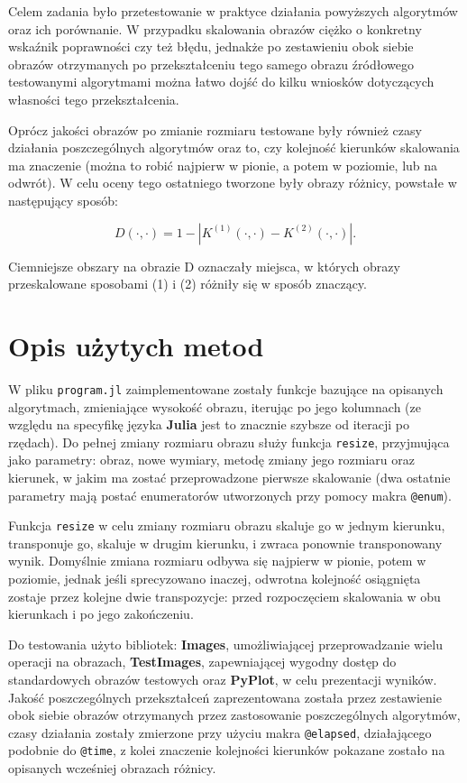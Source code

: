 \documentclass{article}
\begin{document}
Celem zadania było przetestowanie w praktyce działania powyższych algorytmów oraz ich porównanie. W przypadku skalowania obrazów ciężko o konkretny wskaźnik poprawności czy też błędu, jednakże po zestawieniu obok siebie obrazów otrzymanych po przekształceniu tego samego obrazu źródłowego testowanymi algorytmami można łatwo dojść do kilku wniosków dotyczących własności tego przekształcenia.

Oprócz jakości obrazów po zmianie rozmiaru testowane były również czasy działania poszczególnych algorytmów oraz to, czy kolejność kierunków skalowania ma znaczenie (można to robić najpierw w pionie, a potem w poziomie, lub na odwrót). W celu oceny tego ostatniego tworzone były obrazy różnicy, powstałe w następujący sposób:

$$D(\cdot,\cdot) = 1 - |K^{(1)}(\cdot,\cdot) - K^{(2)}(\cdot,\cdot)|.$$

Ciemniejsze obszary na obrazie D oznaczały miejsca, w których obrazy przeskalowane sposobami (1) i (2) różniły się w sposób znaczący.

\section{Opis użytych metod}

W pliku \texttt{program.jl} zaimplementowane zostały funkcje bazujące na opisanych algorytmach, zmieniające wysokość obrazu, iterując po jego kolumnach (ze względu na specyfikę języka \textbf{Julia} jest to znacznie szybsze od iteracji po rzędach). Do pełnej zmiany rozmiaru obrazu służy funkcja \texttt{resize}, przyjmująca jako parametry: obraz, nowe wymiary, metodę zmiany jego rozmiaru oraz kierunek, w jakim ma zostać przeprowadzone pierwsze skalowanie (dwa ostatnie parametry mają postać enumeratorów utworzonych przy pomocy makra \texttt{@enum}).  

Funkcja \texttt{resize} w celu zmiany rozmiaru obrazu skaluje go w jednym kierunku, transponuje go, skaluje w drugim kierunku, i zwraca ponownie transponowany wynik. Domyślnie zmiana rozmiaru odbywa się najpierw w pionie, potem w poziomie, jednak jeśli sprecyzowano inaczej, odwrotna kolejność osiągnięta zostaje przez kolejne dwie transpozycje: przed rozpoczęciem skalowania w obu kierunkach i po jego zakończeniu.

Do testowania użyto bibliotek: \textbf{Images}, umożliwiającej przeprowadzanie wielu operacji na obrazach, \textbf{TestImages}, zapewniającej wygodny dostęp do standardowych obrazów testowych oraz \textbf{PyPlot}, w celu prezentacji wyników. Jakość poszczególnych przekształceń zaprezentowana została przez zestawienie obok siebie obrazów otrzymanych przez zastosowanie poszczególnych algorytmów, czasy działania zostały zmierzone przy użyciu makra \texttt{@elapsed}, działającego podobnie do \texttt{@time}, z kolei znaczenie kolejności kierunków pokazane zostało na opisanych wcześniej obrazach różnicy.
\end{document}
